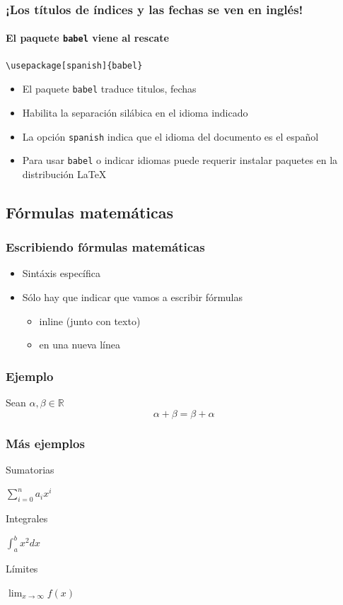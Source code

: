\documentclass[svgnames]{beamer}
\begin{document}
\begin{frame}[fragile]
  \frametitle{¡Los títulos de índices y las fechas se ven en inglés!}
  \framesubtitle{El paquete \texttt{babel} viene al rescate}

  \begin{lstlisting}[style=latex]
\usepackage[spanish]{babel}
  \end{lstlisting}

  \begin{itemize}
    \item El paquete \texttt{babel} traduce titulos, fechas
    \item Habilita la separación silábica en el idioma indicado
    \item La opción \texttt{spanish} indica que el idioma del documento es el español
    \item Para usar \texttt{babel} o indicar idiomas puede requerir instalar paquetes en la distribución \LaTeX
  \end{itemize}
\end{frame}

\subsection{Fórmulas matemáticas}

\begin{frame}
  \frametitle{Escribiendo fórmulas matemáticas}
  \begin{itemize}
    \item Sintáxis específica
    \item Sólo hay que indicar que vamos a escribir fórmulas
    \begin{itemize}
     \item inline (junto con texto)
     \item en una nueva línea
    \end{itemize}
   \end{itemize}
\end{frame}

\begin{frame}
  \frametitle{Ejemplo}
   {}
   {Sean $ \alpha, \beta \in \mathbb{R} $\begin{equation*} \alpha + \beta = \beta + \alpha\end{equation*} }
\end{frame}

\begin{frame}
  \frametitle{Más ejemplos}
  Sumatorias
  {}
  \begin{center}
    $\sum_{i=0}^{n} a_ix^i$
  \end{center}\pause
  Integrales
  {}
  \begin{center}
    $\int_{a}^{b} x^2 dx$
  \end{center}\pause
  Límites
  {}
  \begin{center}
    $\lim_{x\to\infty} f(x)$
  \end{center}
\end{frame}
\end{document}
